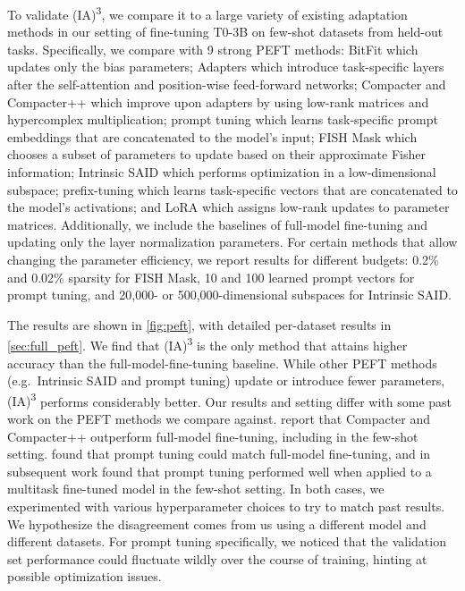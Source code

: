 To validate {\selectfont (IA)\textsuperscript{3}}, we compare it to a large variety of existing adaptation methods in our setting of fine-tuning T0-3B on few-shot datasets from held-out tasks. Specifically, we compare with 9 strong PEFT methods: BitFit \cite{zaken2021bitfit} which updates only the bias parameters; Adapters \cite{Houlsby2019ParameterEfficientTL} which introduce task-specific layers after the self-attention and position-wise feed-forward networks; Compacter and Compacter++ \cite{mahabadi2021compacter} which improve upon adapters by using low-rank matrices and hypercomplex multiplication; prompt tuning \cite{lester2021power} which learns task-specific prompt embeddings that are concatenated to the model's input; FISH Mask \cite{sung2021training} which chooses a subset of parameters to update based on their approximate Fisher information; Intrinsic SAID \cite{aghajanyan2020intrinsic} which performs optimization in a low-dimensional subspace; prefix-tuning \cite{li2021prefix} which learns task-specific vectors that are concatenated to the model's activations; and LoRA \cite{hu2021lora} which assigns low-rank updates to parameter matrices. Additionally, we include the baselines of full-model fine-tuning and updating only the layer normalization parameters. For certain methods that allow changing the parameter efficiency, we report results for different budgets: 0.2\% and 0.02\% sparsity for FISH Mask, 10 and 100 learned prompt vectors for prompt tuning, and 20,000- or 500,000-dimensional subspaces for Intrinsic SAID.

The results are shown in \ref{fig:peft}, with detailed per-dataset results in \ref{sec:full_peft}.
We find that {\selectfont (IA)\textsuperscript{3}} is the only method that attains higher accuracy than the full-model-fine-tuning baseline. While other PEFT methods (e.g.\ Intrinsic SAID and prompt tuning) update or introduce fewer parameters, {\selectfont (IA)\textsuperscript{3}} performs considerably better. Our results and setting differ with some past work on the PEFT methods we compare against.
\citet{mahabadi2021compacter} report that Compacter and Compacter++ outperform full-model fine-tuning, including in the few-shot setting.
\citet{lester2021power} found that prompt tuning could match full-model fine-tuning, and in subsequent work \citet{wei2021finetuned} found that prompt tuning performed well when applied to a multitask fine-tuned model in the few-shot setting. In both cases, we experimented with various hyperparameter choices to try to match past results. We hypothesize the disagreement comes from us using a different model and different datasets. For prompt tuning specifically, we noticed that the validation set performance could fluctuate wildly over the course of training, hinting at possible optimization issues.


